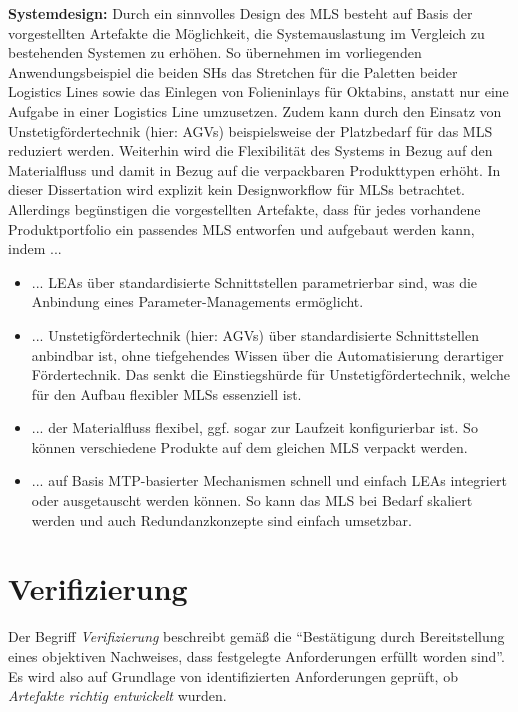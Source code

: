 \textbf{Systemdesign:} Durch ein sinnvolles Design des MLS besteht auf Basis der vorgestellten Artefakte die Möglichkeit, die Systemauslastung im Vergleich zu bestehenden Systemen zu erhöhen. So übernehmen im vorliegenden Anwendungsbeispiel die beiden SHs das Stretchen für die Paletten beider Logistics Lines sowie das Einlegen von Folieninlays für Oktabins, anstatt nur eine Aufgabe in einer Logistics Line umzusetzen. Zudem kann durch den Einsatz von Unstetigfördertechnik (hier: AGVs) beispielsweise der Platzbedarf für das MLS reduziert werden. Weiterhin wird die Flexibilität des Systems in Bezug auf den Materialfluss und damit in Bezug auf die verpackbaren Produkttypen erhöht. In dieser Dissertation wird explizit kein Designworkflow für MLSs betrachtet. Allerdings begünstigen die vorgestellten Artefakte, dass für jedes vorhandene Produktportfolio ein passendes MLS entworfen und aufgebaut werden kann, indem ...

\begin{itemize}
	\item ... LEAs über standardisierte Schnittstellen parametrierbar sind, was die Anbindung eines Parameter-Managements ermöglicht.
	\item ... Unstetigfördertechnik (hier: AGVs) über standardisierte Schnittstellen anbindbar ist, ohne tiefgehendes Wissen über die Automatisierung derartiger Fördertechnik. Das senkt die Einstiegshürde für Unstetigfördertechnik, welche für den Aufbau flexibler MLSs essenziell ist.
	\item ... der Materialfluss flexibel, ggf. sogar zur Laufzeit konfigurierbar ist. So können verschiedene Produkte auf dem gleichen MLS verpackt werden.
	\item ... auf Basis MTP-basierter Mechanismen schnell und einfach LEAs integriert oder ausgetauscht werden können. So kann das MLS bei Bedarf skaliert werden und auch Redundanzkonzepte sind einfach umsetzbar.
\end{itemize}


\section{Verifizierung}
\label{sec:Verifizierung}

Der Begriff \emph{Verifizierung} beschreibt gemäß \cite{DINNormenausschussQualitatsmanagementStatistikundZertifizierungsgrundlagen.2015} die \enquote{Bestätigung durch Bereitstellung eines objektiven Nachweises, dass festgelegte Anforderungen erfüllt worden sind}. Es wird also auf Grundlage von identifizierten Anforderungen geprüft, ob \emph{Artefakte richtig entwickelt} wurden. 


